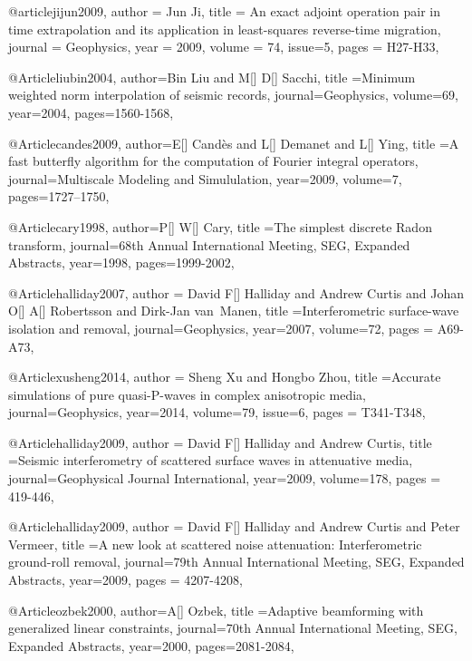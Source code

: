 @article{jijun2009,
  author =	 {Jun Ji},
  title =	 {An exact adjoint operation pair in time extrapolation and its application in least-squares reverse-time migration},
  journal = 	 {Geophysics},
  year = 	 2009,
  volume =	 74,
    issue=5,
  pages =	 {H27-H33},
}

@Article{liubin2004,
  author={Bin Liu and M[] D[] Sacchi},
  title ={Minimum weighted norm interpolation of seismic records},
  journal={Geophysics},
  volume=69,
  year=2004,
  pages={1560-1568},
}

@Article{candes2009,
  author={E[] Cand\`{e}s and L[] Demanet and L[] Ying},
  title ={A fast butterfly algorithm for the computation of {F}ourier integral operators},
  journal={Multiscale Modeling and Simululation},
  year=2009,
  volume=7,
  pages={1727–1750},
}

@Article{cary1998,
  author={P[] W[] Cary},
  title ={The simplest discrete Radon transform},
  journal={68th Annual International Meeting, SEG, Expanded Abstracts},
  year=1998,
  pages={1999-2002},
}




@Article{halliday2007,
  author = {David F[] Halliday and Andrew Curtis  and Johan O[] A[] Robertsson and Dirk-Jan van~Manen},
  title ={Interferometric surface-wave isolation and removal},
  journal={Geophysics},
  year=2007,
  volume={72},
  pages = {A69-A73},
}

@Article{xusheng2014,
  author = {Sheng Xu and Hongbo Zhou},
  title ={Accurate simulations of pure quasi-P-waves in complex anisotropic media},
  journal={Geophysics},
  year=2014,
  volume={79},
  issue=6,
  pages = {T341-T348},
}

@Article{halliday2009,
  author = {David F[] Halliday and Andrew Curtis},
  title ={Seismic interferometry of scattered surface waves in attenuative media},
  journal={Geophysical Journal International},
  year=2009,
  volume={178},
  pages = {419-446},
}





@Article{halliday2009,
  author = {David F[] Halliday and Andrew Curtis and Peter Vermeer},
  title ={A new look at scattered noise attenuation: Interferometric ground-roll removal},
  journal={79th Annual International Meeting, SEG, Expanded Abstracts},
  year=2009,
  pages = {4207-4208},
}

@Article{ozbek2000,
  author={A[] Ozbek},
  title ={Adaptive beamforming with generalized linear constraints},
  journal={70th Annual International Meeting, SEG, Expanded Abstracts},
  year=2000,
  pages={2081-2084},
}

